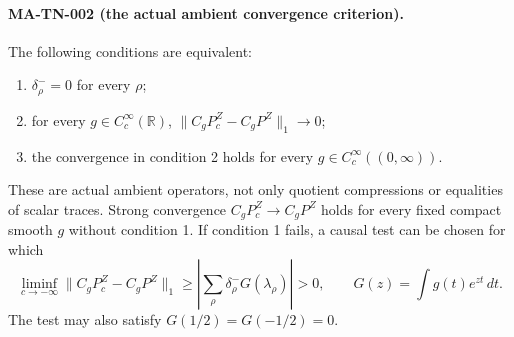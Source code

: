 \paragraph{MA-TN-002 (the actual ambient convergence criterion).}
The following conditions are equivalent:
\begin{enumerate}
 \item \(\delta_\rho^-=0\) for every \(\rho\);
 \item for every \(g\in C_c^\infty(\mathbb R)\),
 \(\|C_gP_c^Z-C_gP^Z\|_1\to0\);
 \item the convergence in condition 2 holds for every
 \(g\in C_c^\infty((0,\infty))\).
\end{enumerate}
These are actual ambient operators, not only quotient
compressions or equalities of scalar traces.
Strong convergence \(C_gP_c^Z\to C_gP^Z\) holds for every
fixed compact smooth \(g\) without condition 1.
If condition 1 fails, a causal test can be chosen for which
\[
 \liminf_{c\to-\infty}
       \|C_gP_c^Z-C_gP^Z\|_1
 \ge\left|\sum_\rho\delta_\rho^-G(\lambda_\rho)\right|>0,
 \qquad G(z)=\int g(t)e^{zt}\,dt .
 \tag{MA-TN.14}
\]
The test may also satisfy \(G(1/2)=G(-1/2)=0\).

